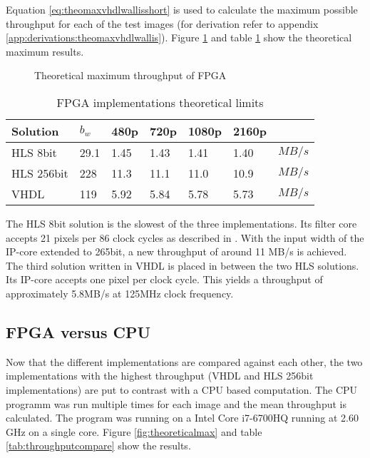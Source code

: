 Equation \ref{eq:theomaxvhdlwallisshort} is used to calculate the maximum
possible throughput for each of the test images (for derivation refer to
appendix \ref{app:derivations:theomaxvhdlwallis}). Figure \ref{fig:theoresults}
and table \ref{tab:FPGAimplementationstheoreticallimits} show the theoretical
maximum results.

\begin{figure}[b!]
    \centering
    \begin{adjustbox}{max width=\linewidth}
        
    \end{adjustbox}
    \caption{Theoretical maximum throughput of FPGA}
    \label{fig:theoresults}
\end{figure}

\begin{table}[b!]
    \centering
    \begin{tabular}{l l l l l l l}
        \toprule
        Solution & $b_w$ & 480p & 720p & 1080p & 2160p & \\
        \midrule
        HLS 8bit       & 29.1 & 1.45 & 1.43 & 1.41 & 1.40 & $MB/s$\\
        HLS 256bit     & 228  & 11.3 & 11.1 & 11.0 & 10.9 & $MB/s$\\
        VHDL           & 119  & 5.92 & 5.84 & 5.78 & 5.73 & $MB/s$\\
        \bottomrule
    \end{tabular}
    \caption{FPGA implementations theoretical limits}
    \label{tab:FPGAimplementationstheoreticallimits}
\end{table}

The HLS 8bit solution is the slowest of the three implementations. Its filter
core accepts 21 pixels per 86 clock cycles as described in . With the input width of the IP-core extended to 265bit,
a new throughput of around 11 MB/s is achieved. The third solution written
in VHDL is placed in between the two HLS solutions. Its IP-core accepts one
pixel per clock cycle. This yields a throughput of approximately 5.8MB/s at
125MHz clock frequency.

\clearpage
\subsection{FPGA versus CPU}
Now that the different implementations are compared against each other, the
two implementations with the highest throughput (VHDL and HLS 256bit
implementations) are put to contrast with a CPU based computation.  The CPU
programm was run multiple times for each image and the mean throughput is
calculated. The program was running on a Intel Core i7-6700HQ running at 2.60
GHz on a single core.  Figure \ref{fig:theoreticalmax} and table
\ref{tab:throughputcompare} show the results.
\\

